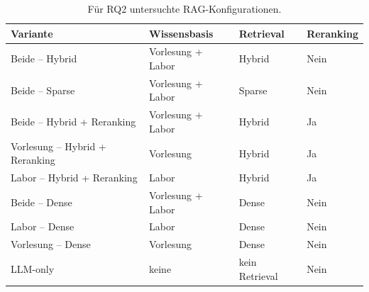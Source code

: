 \begin{table}[htbp]
    \centering
    \caption{Für RQ2 untersuchte RAG-Konfigurationen.}
    \label{tab:rag_konfigurationen}
    \renewcommand{\arraystretch}{1.2}
    \begin{tabularx}{\linewidth}{
        @{}
        >{\raggedright\arraybackslash}X
        >{\raggedright\arraybackslash}p{3.0cm}
        >{\raggedright\arraybackslash}p{2.6cm}
        >{\centering\arraybackslash}p{1.8cm}
        @{}
    }
        \toprule
        \textbf{Variante} &
        \textbf{Wissensbasis} &
        \textbf{Retrieval} &
        \textbf{Reranking} \\
        \midrule
 
        Beide -- Hybrid &
        Vorlesung + Labor &
        Hybrid &
        Nein \\
 
        Beide -- Sparse &
        Vorlesung + Labor &
        Sparse &
        Nein \\
 
        Beide -- Hybrid + Reranking &
        Vorlesung + Labor &
        Hybrid &
        Ja \\
 
        Vorlesung -- Hybrid + Reranking &
        Vorlesung &
        Hybrid &
        Ja \\
 
        Labor -- Hybrid + Reranking &
        Labor &
        Hybrid &
        Ja \\
 
        Beide -- Dense &
        Vorlesung + Labor &
        Dense &
        Nein \\
 
        Labor -- Dense &
        Labor &
        Dense &
        Nein \\
 
        Vorlesung -- Dense &
        Vorlesung &
        Dense &
        Nein \\
 
        LLM-only &
        keine &
        kein Retrieval &
        Nein \\
 
        \bottomrule
    \end{tabularx}
\end{table}
 
